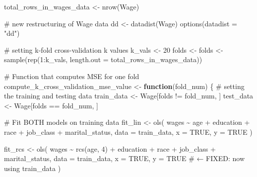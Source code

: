 \documentclass[
  letterpaper,
  DIV=11,
  numbers=noendperiod]{scrreprt}
\newenvironment{Shaded}{\begin{snugshade}}{\end{snugshade}}
\newcommand{\AttributeTok}[1]{\textcolor[rgb]{0.40,0.45,0.13}{#1}}
\newcommand{\CommentTok}[1]{\textcolor[rgb]{0.37,0.37,0.37}{#1}}
\newcommand{\ConstantTok}[1]{\textcolor[rgb]{0.56,0.35,0.01}{#1}}
\newcommand{\ControlFlowTok}[1]{\textcolor[rgb]{0.00,0.23,0.31}{\textbf{#1}}}
\newcommand{\DecValTok}[1]{\textcolor[rgb]{0.68,0.00,0.00}{#1}}
\newcommand{\FunctionTok}[1]{\textcolor[rgb]{0.28,0.35,0.67}{#1}}
\newcommand{\NormalTok}[1]{\textcolor[rgb]{0.00,0.23,0.31}{#1}}
\newcommand{\OtherTok}[1]{\textcolor[rgb]{0.00,0.23,0.31}{#1}}
\newcommand{\SpecialCharTok}[1]{\textcolor[rgb]{0.37,0.37,0.37}{#1}}
\newcommand{\StringTok}[1]{\textcolor[rgb]{0.13,0.47,0.30}{#1}}
\begin{document}
{\begin{Shaded}
\begin{Highlighting}[]
\NormalTok{total\_rows\_in\_wages\_data }\OtherTok{\textless{}{-}} \FunctionTok{nrow}\NormalTok{(Wage)}

\CommentTok{\# new restructuring of Wage data}
\NormalTok{dd }\OtherTok{\textless{}{-}} \FunctionTok{datadist}\NormalTok{(Wage)}
\FunctionTok{options}\NormalTok{(}\AttributeTok{datadist =} \StringTok{"dd"}\NormalTok{)}

\CommentTok{\# setting k{-}fold cross{-}validation k values}
\NormalTok{k\_vals }\OtherTok{\textless{}{-}} \DecValTok{20}                            
\NormalTok{folds }\OtherTok{\textless{}{-}}\NormalTok{ folds }\OtherTok{\textless{}{-}} \FunctionTok{sample}\NormalTok{(}\FunctionTok{rep}\NormalTok{(}\DecValTok{1}\SpecialCharTok{:}\NormalTok{k\_vals, }\AttributeTok{length.out =}\NormalTok{ total\_rows\_in\_wages\_data))}

\CommentTok{\# Function that computes MSE for one fold}
\NormalTok{compute\_k\_cross\_validation\_mse\_value }\OtherTok{\textless{}{-}} \ControlFlowTok{function}\NormalTok{(fold\_num) \{}
  \CommentTok{\# setting the training and testing data}
\NormalTok{  train\_data }\OtherTok{\textless{}{-}}\NormalTok{ Wage[folds }\SpecialCharTok{!=}\NormalTok{ fold\_num, ]}
\NormalTok{  test\_data  }\OtherTok{\textless{}{-}}\NormalTok{ Wage[folds }\SpecialCharTok{==}\NormalTok{ fold\_num, ]}
  
  \CommentTok{\# Fit BOTH models on training data}
\NormalTok{  fit\_lin }\OtherTok{\textless{}{-}} \FunctionTok{ols}\NormalTok{(}
\NormalTok{    wages }\SpecialCharTok{\textasciitilde{}}\NormalTok{ age }\SpecialCharTok{+}\NormalTok{ education }\SpecialCharTok{+}\NormalTok{ race }\SpecialCharTok{+}\NormalTok{ job\_class }\SpecialCharTok{+}\NormalTok{ marital\_status,}
    \AttributeTok{data =}\NormalTok{ train\_data, }\AttributeTok{x =} \ConstantTok{TRUE}\NormalTok{, }\AttributeTok{y =} \ConstantTok{TRUE}
\NormalTok{  )}
  
\NormalTok{  fit\_rcs }\OtherTok{\textless{}{-}} \FunctionTok{ols}\NormalTok{(}
\NormalTok{    wages }\SpecialCharTok{\textasciitilde{}} \FunctionTok{rcs}\NormalTok{(age, }\DecValTok{4}\NormalTok{) }\SpecialCharTok{+}\NormalTok{ education }\SpecialCharTok{+}\NormalTok{ race }\SpecialCharTok{+}\NormalTok{ job\_class }\SpecialCharTok{+}\NormalTok{ marital\_status,}
    \AttributeTok{data =}\NormalTok{ train\_data, }\AttributeTok{x =} \ConstantTok{TRUE}\NormalTok{, }\AttributeTok{y =} \ConstantTok{TRUE}     \CommentTok{\# ← FIXED: now using train\_data}
\NormalTok{  )}
  

\end{Highlighting}
\end{Shaded}}
\end{document}
